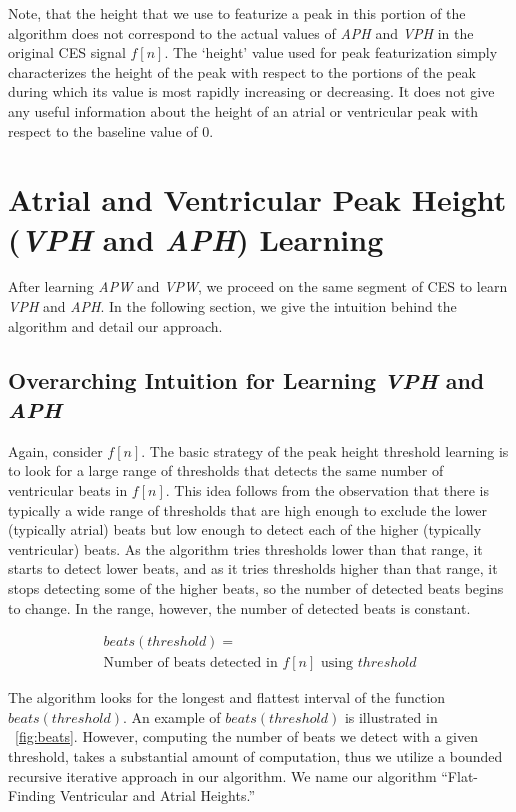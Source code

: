 \documentclass[conference]{IEEEtran}
\newcommand{\APW}{\textit{APW}}
\newcommand{\VPW}{\textit{VPW}}
\newcommand{\APH}{\textit{APH}}
\newcommand{\VPH}{\textit{VPH}}
\begin{document}
Note, that the height that we use to featurize a peak in
this portion of the algorithm does not correspond to the
actual values of \APH{} and \VPH{} in the original CES
signal $f[n]$. The `height' value used for peak
featurization simply characterizes the height of the peak
with respect to the portions of the peak during which its
value is most rapidly increasing or decreasing. It does
not give any useful information about the height of an
atrial or ventricular peak with respect to the baseline
value of 0.

\section{Atrial and Ventricular Peak Height (\VPH{} and \APH{}) Learning}
After learning \APW{} and \VPW{}, we proceed on the
same segment of CES to learn \VPH{} and \APH{}. In
the following section, we give the intuition behind the
algorithm and detail our approach.

\subsection{Overarching Intuition for Learning \VPH{} and \APH{}}
Again, consider $f[n]$. The basic strategy of the peak
height threshold learning is to look for a large range of
thresholds that detects the same number of ventricular beats in
$f[n]$. This idea follows from the observation that there
is typically a wide range of thresholds that are high
enough to exclude the lower (typically atrial) beats but
low enough to detect each of the higher (typically
ventricular) beats. As the algorithm tries thresholds
lower than that range, it starts to detect lower beats, and
as it tries thresholds higher than that range, it stops
detecting some of the higher beats, so the number of
detected beats begins to change. In the range, however,
the number of detected beats is constant.

\begin{multline}
	beats(threshold) = \\\text{Number of beats detected in } f[n] \text{ using } threshold
\end{multline}

The algorithm looks for the longest and flattest
interval of the function $beats(threshold)$. An example of
$beats(threshold)$ is illustrated in \figurename~\ref{fig:beats}.
However, computing the number of beats we detect with a given
threshold, takes a substantial amount of computation,
thus we utilize a bounded recursive iterative approach in our
algorithm. We name our algorithm ``Flat-Finding
Ventricular and Atrial Heights.''
\end{document}
